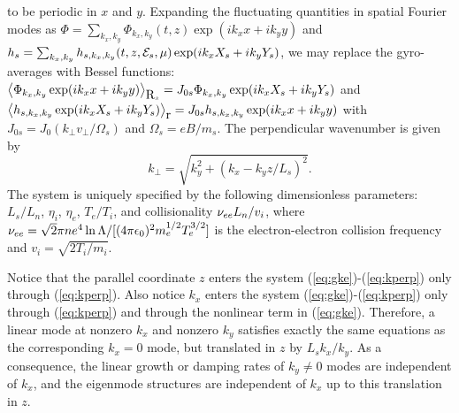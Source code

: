 \documentclass{jpp}
\begin{document}
to be periodic in $x$ and $y$.
Expanding the fluctuating quantities in spatial Fourier modes as $\Phi = \sum_{k_x,k_y} \Phi_{k_x,k_y}(t,z) \exp(i k_x x + i k_y y)$
and $h_s = \sum_{k_x,k_y} h_{s,k_x,k_y}(t,z,\mathcal{E}_s,\mu) \exp(i k_x X_s + i k_y Y_s)$,
we may replace the gyro-averages with Bessel functions:
$\left<\Phi_{k_x,k_y} \exp(i k_x x + i k_y y)\right>_{\boldsymbol{$R$}_s}
=J_{0s} \Phi_{k_x,k_y} \exp(i k_x X_s + i k_y Y_s)$
and
$\left<h_{s,k_x,k_y}\exp(i k_x X_s + i k_y Y_s)\right>_{\boldsymbol{$r$}} = J_{0s} h_{s,k_x,k_y}\exp(i k_x x + i k_y y)$
with $J_{0s} = J_0(k_{\perp} v_{\perp} / \Omega_s)$
and $\Omega_s = e B/m_s$.
The perpendicular wavenumber is given by
\begin{equation}
k_{\perp} = \sqrt{k_y^2 + (k_x - k_y z/L_s)^2}.
\label{eq:kperp}
\end{equation}
The system is uniquely specified by the following dimensionless parameters:
$L_s / L_n$, $\eta_i$, $\eta_e$, $T_e / T_i$, and collisionality $\nu_{ee} L_n / v_i$,
where $\nu_{ee} = \sqrt{2}\pi n e^4 \ln\Lambda/[(4\pi\epsilon_0)^2 m_e^{1/2} T_e^{3/2}]$ is the electron-electron collision frequency
and $v_i = \sqrt{2 T_i / m_i}$.

Notice that the parallel coordinate $z$ enters the system (\ref{eq:gke})-(\ref{eq:kperp}) only through (\ref{eq:kperp}).
Also notice $k_x$ enters the system (\ref{eq:gke})-(\ref{eq:kperp}) only through (\ref{eq:kperp}) and through the nonlinear term in (\ref{eq:gke}).
Therefore, a linear mode at nonzero $k_x$ and nonzero $k_y$ satisfies exactly the same equations as the corresponding $k_x=0$ mode, but translated in $z$ by
$L_s k_x / k_y$.  As a consequence, the linear growth or damping rates of $k_y \ne 0$ modes
are independent of $k_x$, and the eigenmode structures are independent of $k_x$
up to this translation in $z$.
\end{document}
